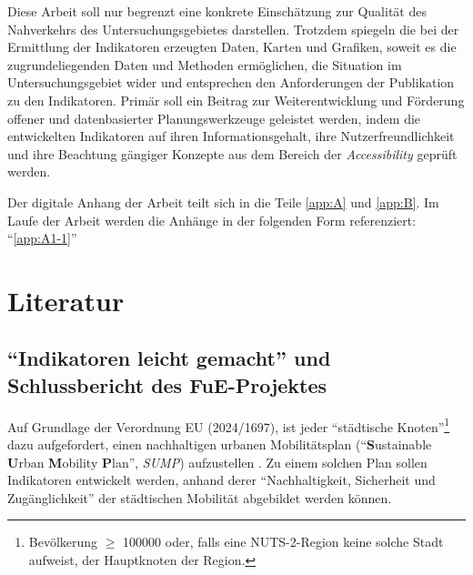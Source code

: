 \documentclass[11pt,pdftex,a4paper]{scrartcl}
\begin{document}
	Diese Arbeit soll {nur begrenzt} eine konkrete Einschätzung zur Qualität des Nahverkehrs des Untersuchungsgebietes darstellen. Trotzdem spiegeln die bei der Ermittlung der Indikatoren erzeugten Daten, Karten und Grafiken, soweit es die zugrundeliegenden Daten und Methoden ermöglichen, die Situation im Untersuchungsgebiet wider und entsprechen den Anforderungen der Publikation zu den Indikatoren. Primär soll ein Beitrag zur Weiterentwicklung und Förderung offener und datenbasierter Planungswerkzeuge geleistet werden, indem die entwickelten Indikatoren auf ihren Informationsgehalt, ihre Nutzerfreundlichkeit und ihre Beachtung gängiger Konzepte aus dem Bereich der \textit{Accessibility} geprüft werden.
	
	Der digitale Anhang der Arbeit teilt sich in die Teile \ref{app:A} und \ref{app:B}. Im Laufe der Arbeit werden die Anhänge in der folgenden Form referenziert: \enquote{\ref{app:A1-1}}
   \pagebreak
	\section{Literatur}
	\subsection{\enquote{Indikatoren leicht gemacht} und Schlussbericht des FuE-Projektes}
	\label{sec:schlussbericht}
	Auf Grundlage der Verordnung EU (2024/1697)\parencite{RegulationEU20242024}, ist jeder \enquote{städtische Knoten}\footnote{Bevölkerung $\geq$ \num{100000} oder, falls eine NUTS-2-Region keine solche Stadt aufweist, der Hauptknoten der Region.} dazu aufgefordert, einen nachhaltigen urbanen Mobilitätsplan (\enquote{\textbf{S}ustainable \textbf{U}rban \textbf{M}obility \textbf{P}lan}, \textit{SUMP}) aufzustellen \parencite[Art. 41 Abs. 1 b) i)]{RegulationEU20242024}. Zu einem solchen Plan sollen Indikatoren entwickelt werden, anhand derer \enquote{Nachhaltigkeit, Sicherheit und Zugänglichkeit} der städtischen Mobilität abgebildet werden können.
	
\end{document}

